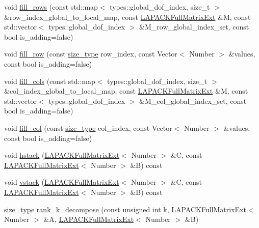 \begin{DoxyCompactItemize}
\item 
void \hyperlink{classLAPACKFullMatrixExt_a73e9ad59ab56c377edc852d8ba16995c}{fill\+\_\+rows} (const std\+::map$<$ types\+::global\+\_\+dof\+\_\+index, size\+\_\+t $>$ \&row\+\_\+index\+\_\+global\+\_\+to\+\_\+local\+\_\+map, const \hyperlink{classLAPACKFullMatrixExt}{L\+A\+P\+A\+C\+K\+Full\+Matrix\+Ext} \&M, const std\+::vector$<$ types\+::global\+\_\+dof\+\_\+index $>$ \&M\+\_\+row\+\_\+global\+\_\+index\+\_\+set, const bool is\+\_\+adding=false)
\item 
void \hyperlink{classLAPACKFullMatrixExt_a74d566120461e1a2437b9fd9a070633f}{fill\+\_\+row} (const \hyperlink{classLAPACKFullMatrixExt_a5cf5f4a6104dc17029210b5ca52bf574}{size\+\_\+type} row\+\_\+index, const Vector$<$ Number $>$ \&values, const bool is\+\_\+adding=false)
\item 
void \hyperlink{classLAPACKFullMatrixExt_af988edbf2f192f0eddf542178755eb91}{fill\+\_\+cols} (const std\+::map$<$ types\+::global\+\_\+dof\+\_\+index, size\+\_\+t $>$ \&col\+\_\+index\+\_\+global\+\_\+to\+\_\+local\+\_\+map, const \hyperlink{classLAPACKFullMatrixExt}{L\+A\+P\+A\+C\+K\+Full\+Matrix\+Ext} \&M, const std\+::vector$<$ types\+::global\+\_\+dof\+\_\+index $>$ \&M\+\_\+col\+\_\+global\+\_\+index\+\_\+set, const bool is\+\_\+adding=false)
\item 
void \hyperlink{classLAPACKFullMatrixExt_a497a2e73b69f5b07cedb729330e95667}{fill\+\_\+col} (const \hyperlink{classLAPACKFullMatrixExt_a5cf5f4a6104dc17029210b5ca52bf574}{size\+\_\+type} col\+\_\+index, const Vector$<$ Number $>$ \&values, const bool is\+\_\+adding=false)
\item 
void \hyperlink{classLAPACKFullMatrixExt_aeeae2d2698007889a47f192043adb75c}{hstack} (\hyperlink{classLAPACKFullMatrixExt}{L\+A\+P\+A\+C\+K\+Full\+Matrix\+Ext}$<$ Number $>$ \&C, const \hyperlink{classLAPACKFullMatrixExt}{L\+A\+P\+A\+C\+K\+Full\+Matrix\+Ext}$<$ Number $>$ \&B) const
\item 
void \hyperlink{classLAPACKFullMatrixExt_a0f315932c3729240d03bc941bb2de849}{vstack} (\hyperlink{classLAPACKFullMatrixExt}{L\+A\+P\+A\+C\+K\+Full\+Matrix\+Ext}$<$ Number $>$ \&C, const \hyperlink{classLAPACKFullMatrixExt}{L\+A\+P\+A\+C\+K\+Full\+Matrix\+Ext}$<$ Number $>$ \&B) const
\item 
\hyperlink{classLAPACKFullMatrixExt_a5cf5f4a6104dc17029210b5ca52bf574}{size\+\_\+type} \hyperlink{classLAPACKFullMatrixExt_ab28877de241a7f5f901fa612c6352ce9}{rank\+\_\+k\+\_\+decompose} (const unsigned int k, \hyperlink{classLAPACKFullMatrixExt}{L\+A\+P\+A\+C\+K\+Full\+Matrix\+Ext}$<$ Number $>$ \&A, \hyperlink{classLAPACKFullMatrixExt}{L\+A\+P\+A\+C\+K\+Full\+Matrix\+Ext}$<$ Number $>$ \&B)

\end{DoxyCompactItemize}
